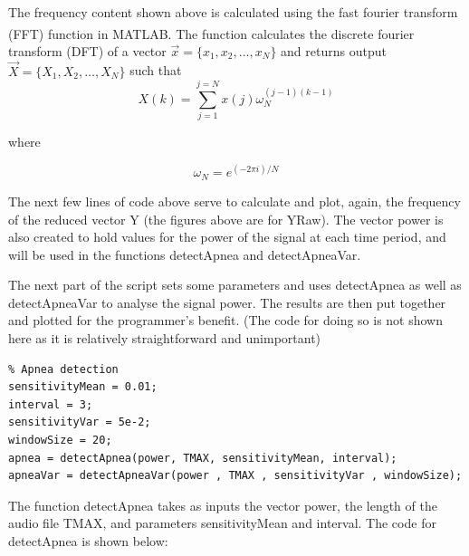 The frequency content shown above is calculated using the fast fourier transform (FFT) function in MATLAB\textsuperscript{\textregistered{}}. The function calculates the discrete fourier transform (DFT) of a vector $\vec x = \{x_1, x_2, \dotsc, x_{N}\}$ and returns output $\vec X = \{X_1, X_2, \dotsc, X_{N}\}$  such that
\begin{equation}
X(k) = \sum_{j=1}^{j=N}x(j)\omega^{(j-1)(k-1)}_N
\end{equation}

where

\begin{equation}
\omega_N = e^{(-2\pi i )/N}
\end{equation}

The next few lines of code above serve to calculate and plot, again, the frequency of the reduced vector Y (the figures above are for YRaw). The vector power is also created to hold values for the power of the signal at each time period, and will be used in the functions detectApnea and detectApneaVar.

The next part of the script sets some parameters and uses detectApnea as well as detectApneaVar to analyse the signal power. The results are then put together and plotted for the programmer's benefit. (The code for doing so is not shown here as it is relatively straightforward and unimportant)

\begin{lstlisting}
% Apnea detection
sensitivityMean = 0.01;
interval = 3;
sensitivityVar = 5e-2;
windowSize = 20;
apnea = detectApnea(power, TMAX, sensitivityMean, interval);
apneaVar = detectApneaVar(power , TMAX , sensitivityVar , windowSize);
\end{lstlisting}

The function detectApnea takes as inputs the vector power, the length of the audio file TMAX, and parameters sensitivityMean and interval. The code for detectApnea is shown below:

